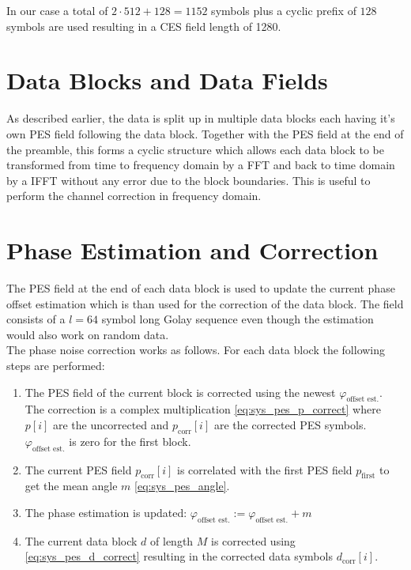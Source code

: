 In our case a total of $2 \cdot 512 + 128 = 1152$ symbols plus
a cyclic prefix of $128$ symbols are used resulting in a \gls{CES} field
length of 1280.

\section{Data Blocks and Data Fields}
\label{sec:sys_data}

As described earlier, the data is split up in multiple data blocks
each having it's own \gls{PES} field following the data block.
Together with the \gls{PES} field at the end of the preamble, this forms
a cyclic structure which allows each data block to be transformed
from time to frequency domain by a \gls{FFT} and back to time domain
by a \gls{IFFT} without any error due to the block boundaries.
This is useful to perform the channel correction in frequency domain. \\

\section{Phase Estimation and Correction}
\label{sec:sys_pes}

The \gls{PES} field at the end of each data block is used to update
the current phase offset estimation which is than used for the correction
of the data block. The field consists of a $l=64$ symbol long Golay
sequence even though the estimation would also work on random data. \\

The phase noise correction works as follows. For each data block
the following steps are performed:

\begin{enumerate}
\item The \gls{PES} field of the current block is corrected
  using the newest $\varphi_{\text{offset est.}}$.
  The correction is a complex multiplication \eqref{eq:sys_pes_p_correct}
  where $p[i]$ are the uncorrected and
  $p_{\text{corr}}[i]$ are the corrected \gls{PES} symbols.
  $\varphi_{\text{offset est.}}$ is zero for the first block.
\item The current \gls{PES} field $p_{\text{corr}}[i]$
  is correlated with the first \gls{PES} field $p_{\text{first}}$
  to get the mean angle $m$ \eqref{eq:sys_pes_angle}.
\item The phase estimation is updated:
  $\varphi_{\text{offset est.}} := \varphi_{\text{offset est.}} + m$
\item The current data block $d$ of length $M$ is corrected using
  \eqref{eq:sys_pes_d_correct} resulting in the corrected
  data symbols $d_{\text{corr}}[i]$.
\end{enumerate}

